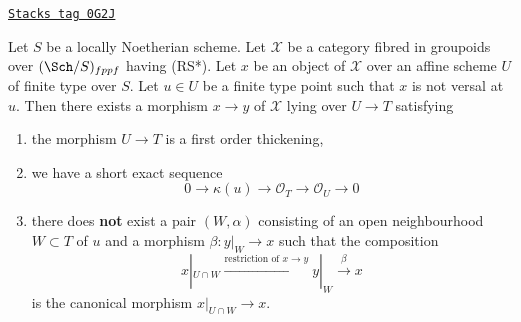 \begin{lemma}
\label{artin-lemma-single-point}
\href{https://stacks.math.columbia.edu/tag/0G2J}{\texttt{Stacks tag 0G2J}}

Let $S$ be a locally Noetherian scheme. Let $\mathcal{X}$ be a category
fibred in groupoids over $(\Sch/S)_{fppf}$ having (RS*).
Let $x$ be an object of $\mathcal{X}$ over an affine scheme $U$
of finite type over $S$. Let $u \in U$ be a finite type point such that
$x$ is not versal at $u$. Then there exists a morphism $x \to y$
of $\mathcal{X}$ lying over $U \to T$ satisfying
\begin{enumerate}
\item the morphism $U \to T$ is a first order thickening,
\item we have a short exact sequence
$$
0 \to \kappa(u) \to \mathcal{O}_T \to \mathcal{O}_U \to 0
$$
\item there does {\bf not} exist a pair $(W, \alpha)$
consisting of an open neighbourhood $W \subset T$ of $u$
and a morphism $\beta : y|_W \to x$ such that the composition
$$
x|_{U \cap W} \xrightarrow{\text{restriction of }x \to y}
y|_W \xrightarrow{\beta} x
$$
is the canonical morphism $x|_{U \cap W} \to x$.
\end{enumerate}
\end{lemma}

